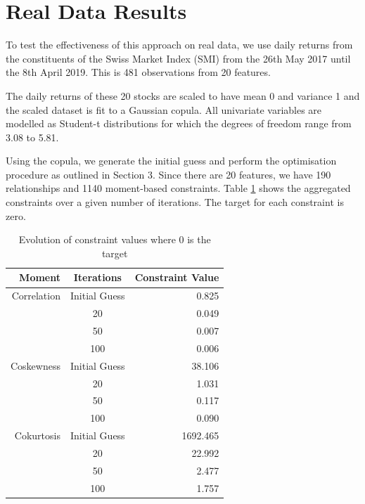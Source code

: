 \documentclass[review]{elsarticle}
\begin{document}


\section{Real Data Results}

To test the effectiveness of this approach on real data, we use daily returns from the constituents of the Swiss Market Index (SMI) from the 26th May 2017 until the 8th April 2019. This is 481 observations from 20 features.

The daily returns of these 20 stocks are scaled to have mean 0 and variance 1 and the scaled dataset is fit to a Gaussian copula. All univariate variables are modelled as Student-t distributions for which the degrees of freedom range from 3.08 to 5.81.

Using the copula, we generate the initial guess and perform the optimisation procedure as outlined in Section 3. Since there are 20 features, we have 190 relationships and 1140 moment-based constraints. Table \ref{table:realcons} shows the aggregated constraints over a given number of iterations. The target for each constraint is zero.

\begin{table}[h!]
\centering
\begin{tabular}{r | c | r}
Moment & Iterations & Constraint Value \\
\hline
Correlation & Initial Guess & 0.825 \\
& 20 & 0.049 \\
& 50 & 0.007 \\
& 100 & 0.006 \\
\hline
Coskewness & Initial Guess & 38.106 \\
& 20 & 1.031 \\
& 50 & 0.117 \\
& 100 & 0.090 \\
\hline
Cokurtosis & Initial Guess & 1692.465 \\
& 20 & 22.992 \\
& 50 & 2.477 \\
& 100 & 1.757 \\
\end{tabular}
\caption{Evolution of constraint values where 0 is the target}
\label{table:realcons}
\end{table}
\end{document}
